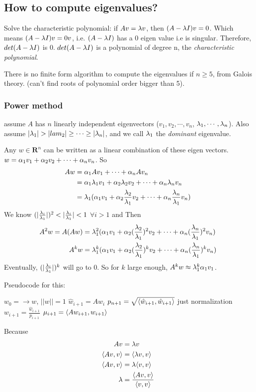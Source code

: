 \subsection{How to compute eigenvalues?}
\label{sec:computeeig}
Solve the characteristic polynomial: if $Av=\lambda v$, then $(A-\lambda I)v
= 0$. Which means $(A-\lambda I)v = 0v$, i.e. $(A-\lambda I)$ has a $0$
eigen value i.e is singular. Therefore, $det(A-\lambda I)$ is
0. $det(A-\lambda I)$ is a polynomial of degree n, the
\emph{characteristic polynomial}.

There is no finite form algorithm to compute the eigenvalues if $n\ge
5$, from Galois theory. (can't find roots of polynomial order bigger
than 5).

\subsubsection{Power method} assume $A$ has $n$ linearly independent
eigenvectors ($v_1,v_2,\cdots,v_n$, $\lambda_1,\cdots,\lambda_n$). Also assume $|\lam_1|>|lam_2|\ge \cdots \ge |\lam_n|$,
and we call $\lambda_1$ the \emph{dominant} eigenvalue.

Any $w\in \mathbf{R}^n$ can be written as a linear combination of
these eigen vectors. $w=\alpha_1v_1 + \alpha_2v_2 + \cdots + \alpha_nv_n$.
So 
\begin{align*}
Aw &= \alpha_1Av_1 + \cdots + \alpha_nAv_n  \\
&=\alpha_1\lambda_1v_1 + \alpha_2\lambda_2v_2 +\cdots + \alpha_n\lambda_nv_n  \\
&=\lambda_1(\alpha_1v_1 + \alpha_2\frac{\lambda_2}{\lambda_1}v_2+ \cdots + \alpha_n\frac{\lambda_n}{\lambda_1}v_n)  \\
\end{align*}
We know $(|\frac{\lam_i}{\lam_1}|)^2 <|\frac{\lam_i}{\lam_1}| < 1$ $\forall i>1$ and
Then 
\begin{align*}
   A^2w = A(Aw) &= \lambda_1^2(\alpha_1v_1 +
   \alpha_2(\frac{\lambda_2}{\lambda_1})^2v_2+\cdots +
   \alpha_n(\frac{\lambda_n}{\lambda_1})^2v_n)  \\
  A^kw &= \lambda_1^k(\alpha_1v_1 +
  \alpha_2(\frac{\lambda_2}{\lambda_1})^kv_2+\cdots +
  \alpha_n(\frac{\lambda_n}{\lambda_1})^kv_n)  \\
\end{align*}
Eventually, $(|\frac{\lambda_i}{\lambda_1}|)^k$ will go to 0. So for $k$
large enough, $A^kw \approx \lambda_1^k\alpha_1v_1$.

Pseudocode for this:
\begin{algorithmic}
\STATE $w_0= \to w$, $||w||=1$
     \STATE $\hat w_{i+1} = Aw_i$
     \STATE $p_{n+1} = \sqrt{\langle \hat w_{i+1}, \hat w_{i+1}\rangle }$ just
     normalization
     \STATE $w_{i+1} = \frac{\hat w_{i+1}}{p_{i+1}}$
     \STATE $\mu_{i+1} = \langle Aw_{i+1}, w_{i+1}\rangle$
  \ENDFOR
\end{algorithmic}
Because 
\begin{align*}
Av&=\lambda v\\
\langle Av, v \rangle &= \langle \lambda v, v\rangle\\
\langle Av, v \rangle &= \lambda\langle v, v\rangle\\
\lambda &= \frac{\langle Av, v \rangle }{\langle v, v\rangle}
\end{align*}

